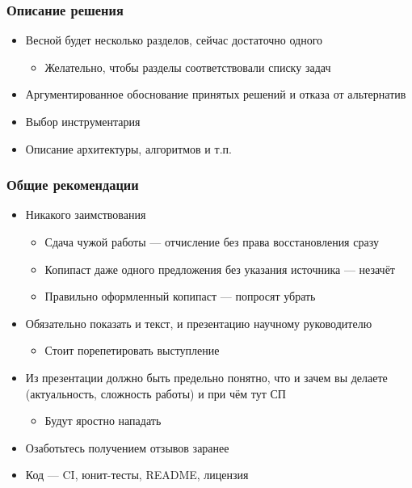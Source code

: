 \documentclass[xetex,mathserif,serif]{beamer}
\begin{document}
    \begin{frame}
        \frametitle{Описание решения}
        \begin{itemize}
            \item Весной будет несколько разделов, сейчас достаточно одного
            \begin{itemize}
                \item Желательно, чтобы разделы соответствовали списку задач
            \end{itemize}
            \item Аргументированное обоснование принятых решений и отказа от альтернатив
            \item Выбор инструментария
            \item Описание архитектуры, алгоритмов и т.п.
        \end{itemize}
    \end{frame}

    \begin{frame}
        \frametitle{Общие рекомендации}
        \begin{itemize}
            \item Никакого заимствования 
            \begin{itemize}
                \item Сдача чужой работы --- отчисление без права восстановления сразу
                \item Копипаст даже одного предложения без указания источника --- незачёт
                \item Правильно оформленный копипаст --- попросят убрать
            \end{itemize}
            \item Обязательно показать и текст, и презентацию научному руководителю
            \begin{itemize}
                \item Стоит порепетировать выступление
            \end{itemize}
            \item Из презентации должно быть предельно понятно, что и зачем вы делаете (актуальность, сложность работы) и при чём тут СП
            \begin{itemize}
                \item Будут яростно нападать
            \end{itemize}
            \item Озаботьтесь получением отзывов заранее
            \item Код --- CI, юнит-тесты, README, лицензия
        \end{itemize}
    \end{frame}
\end{document}
